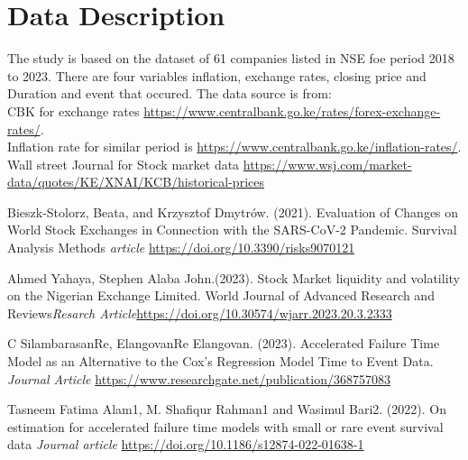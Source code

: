 \documentclass[twoside,a4paper,12pt]{article}
\begin{document}
 

\section*{Data Description}
The study is based on the dataset of 61 companies listed in NSE foe period 2018 to 2023. There are four variables inflation, exchange rates, closing price and Duration and event that occured. The data source is from:\\ CBK for exchange rates \newblock \href{https://www.centralbank.go.ke/rates/forex-exchange-rates/}{https://www.centralbank.go.ke/rates/forex-exchange-rates/}.\\Inflation rate for similar period is \newblock\href{https://www.centralbank.go.ke/inflation-rates/}{https://www.centralbank.go.ke/inflation-rates/}.\\ Wall street Journal for Stock market data \newblock\href{https://www.wsj.com/market-data/quotes/KE/XNAI/KCB/historical-prices}{https://www.wsj.com/market-data/quotes/KE/XNAI/KCB/historical-prices}
\begin{thebibliography}{9}
Bieszk-Stolorz, Beata, and Krzysztof Dmytrów. (2021). Evaluation of Changes on World Stock Exchanges in Connection with the SARS-CoV-2 Pandemic. Survival Analysis Methods \textit{article} \newblock\href{https://doi.org/10.3390/risks9070121}{https://doi.org/10.3390/risks9070121}


 Ahmed Yahaya, Stephen Alaba John.(2023). Stock Market liquidity and volatility on the Nigerian Exchange Limited. World Journal of Advanced Research and Reviews\textit{Resarch Article}\newblock\href{https://doi.org/10.30574/wjarr.2023.20.3.2333}{https://doi.org/10.30574/wjarr.2023.20.3.2333}

C SilambarasanRe, ElangovanRe Elangovan. (2023). Accelerated Failure Time Model as an Alternative to the Cox's Regression Model Time to Event Data. \textit{Journal Article} \newblock\href{https://www.researchgate.net/publication/368757083}{https://www.researchgate.net/publication/368757083}

Tasneem Fatima Alam1, M. Shafiqur Rahman1 and Wasimul Bari2. (2022). On estimation for accelerated failure
time models with small or rare event survival data \textit{Journal article} \newblock \href{https://doi.org/10.1186/s12874-022-01638-1}{https://doi.org/10.1186/s12874-022-01638-1}


\end{thebibliography}
\end{document}
